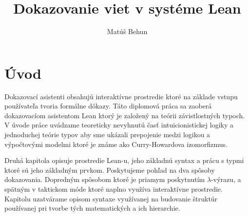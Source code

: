 \documentclass[a4paper,10pt,oneside]{report}%
\author{Mat\'u\v{s} Behun}
\title{Dokazovanie viet v systéme Lean}
\begin{document}






\tableofcontents

\newpage

\chapter{Úvod}
    Dokazovací asistenti obsahujú interaktívne prostredie ktoré na základe vstupu
používateľa tvoria formálne dôkazy.
    Táto diplomová práca sa zaoberá dokazovacíom asistentom Lean ktorý je
založený na teórii závistlostných typoch.
    V úvode práce uvádzame teoreticky nevyhnutú časť intuicionistickej logiky
a jednoduchej teórie typov aby sme ukázali prepojenie medzi logikou a výpočtovými
modelmi ktoré je známe ako Curry-Howardova izomorfizmus.

    Druhá kapitola opisuje prostredie Lean-u, jeho základnú syntax a prácu s 
typmi ktoré sú jeho základným prvkom.
    Poskytujeme pohľad na dva spôsoby dokazovania. Dopredným spôsobom ktoré je priamym
poskytnutím $\lambda$-výrazu, a spätným v taktickom móde ktoré naplno využíva interaktívne prostredie.
    Kapitolu uzatvárame opisom syntaxe využívanej na budovanie štruktúr používanej
pri tvorbe tých matematických a ich hierarchie.
\end{document}
